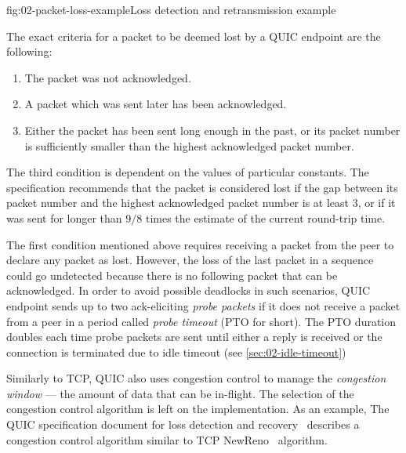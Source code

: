 \begin{myFigure}{fig:02-packet-loss-example}{Loss detection and retransmission example}

\resizebox{\linewidth}{!}{}

\end{myFigure}

The exact criteria for a packet to be deemed lost by a QUIC endpoint are the following:

\begin{enumerate}

  \item The packet was not acknowledged.

  \item A packet which was sent later has been acknowledged.

  \item Either the packet has been sent long enough in the past, or its packet number is
sufficiently smaller than the highest acknowledged packet number.

\end{enumerate}

The third condition is dependent on the values of particular constants. The specification recommends
that the packet is considered lost if the gap between its packet number and the highest acknowledged
packet number is at least 3, or if it was sent for longer than $9/8$ times the estimate of the
current round-trip time.

The first condition mentioned above requires receiving a packet from the peer to declare any packet
as lost. However, the loss of the last packet in a sequence could go undetected because there is no
following packet that can be acknowledged. In order to avoid possible deadlocks in such scenarios,
QUIC endpoint sends up to two ack-eliciting \textit{probe packets} if it does not receive a packet
from a peer in a period called \textit{probe timeout} (PTO for short). The PTO duration doubles each
time probe packets are sent until either a reply is received or the connection is terminated due to
idle timeout (see \autoref{sec:02-idle-timeout})

Similarly to TCP, QUIC also uses congestion control to manage the \textit{congestion window} --- the
amount of data that can be in-flight. The selection of the congestion control algorithm is left on
the implementation. As an example, The QUIC specification document for loss detection and
recovery~\autocite[Section~7]{draft-ietf-quic-recovery} describes a congestion control algorithm
similar to TCP NewReno~\cite{rfc6582} algorithm.


